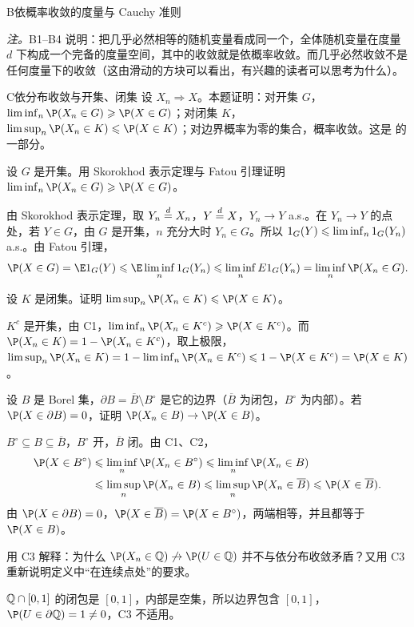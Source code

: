 \begin{probleme}{B}{依概率收敛的度量与 Cauchy 准则}
\begin{questions}
\begin{solution}
\emph{注。}B1--B4 说明：把几乎必然相等的随机变量看成同一个，全体随机变量在度量 $d$ 下构成一个完备的度量空间，其中的收敛就是依概率收敛。而几乎必然收敛不是任何度量下的收敛（这由滑动的方块可以看出，有兴趣的读者可以思考为什么）。
\end{solution}
\end{questions}
\end{probleme}

\begin{probleme}{C}{依分布收敛与开集、闭集}
设 $X_n\Rightarrow X$。本题证明：对开集 $G$，$\liminf_n\P(X_n\in G)\geqslant \P(X\in G)$；对闭集 $K$，$\limsup_n\P(X_n\in K)\leqslant \P(X\in K)$；对边界概率为零的集合，概率收敛。这是 的一部分。
\begin{questions}
\item 设 $G$ 是开集。用 Skorokhod 表示定理与 Fatou 引理证明 $\liminf_n\P(X_n\in G)\geqslant \P(X\in G)$。
\begin{solution}
由 Skorokhod 表示定理，取 $Y_n\stackrel{d}{=} X_n$，$Y\stackrel{d}{=} X$，$Y_n\to Y$ a.s.。在 $Y_n\to Y$ 的点处，若 $Y\in G$，由 $G$ 是开集，$n$ 充分大时 $Y_n\in G$。所以 $1_G(Y)\leqslant\liminf_n1_G(Y_n)$ a.s.。由 Fatou 引理，
\[
\P(X\in G)=\E\one_G(Y)\leqslant \E\liminf_n\one_G(Y_n)\leqslant\liminf_nE\one_G(Y_n)=\liminf_n\P(X_n\in G).
\]
\end{solution}
\item 设 $K$ 是闭集。证明 $\limsup_n\P(X_n\in K)\leqslant \P(X\in K)$。
\begin{solution}
$K^c$ 是开集，由 C1，$\liminf_n\P(X_n\in K^c)\geqslant \P(X\in K^c)$。而 $\P(X_n\in K)=1-\P(X_n\in K^c)$，取上极限，$\limsup_n\P(X_n\in K)=1-\liminf_n\P(X_n\in K^c)\leqslant1-\P(X\in K^c)=\P(X\in K)$。
\end{solution}
\item 设 $B$ 是 Borel 集，$\partial B=\overline B\setminus B^\circ$ 是它的边界（$\overline B$ 为闭包，$B^\circ$ 为内部）。若 $\P(X\in\partial B)=0$，证明 $\P(X_n\in B)\to \P(X\in B)$。
\begin{solution}
$B^\circ\subseteq B\subseteq\overline B$，$B^\circ$ 开，$\overline B$ 闭。由 C1、C2，
\[
\begin{aligned}
\P(X\in B^\circ)&\leqslant\liminf_n\P(X_n\in B^\circ)\leqslant\liminf_n\P(X_n\in B)\\
&\leqslant\limsup_n\P(X_n\in B)\leqslant\limsup_n\P(X_n\in\overline B)\leqslant \P(X\in\overline B).
\end{aligned}
\]
由 $\P(X\in\partial B)=0$，$\P(X\in\overline B)=\P(X\in B^\circ)$，两端相等，并且都等于 $\P(X\in B)$。
\end{solution}
\item 用 C3 解释：为什么 $\P(X_n\in\Q)\not\to \P(U\in\Q)$ 并不与依分布收敛矛盾？又用 C3 重新说明定义中“在连续点处”的要求。
\begin{solution}
$\mathbb{Q}\cap[0,1]$ 的闭包是 $[0,1]$，内部是空集，所以边界包含 $[0,1]$，$\P(U\in\partial\Q)=1\neq0$，C3 不适用。


\end{solution}
\end{questions}
\end{probleme}
